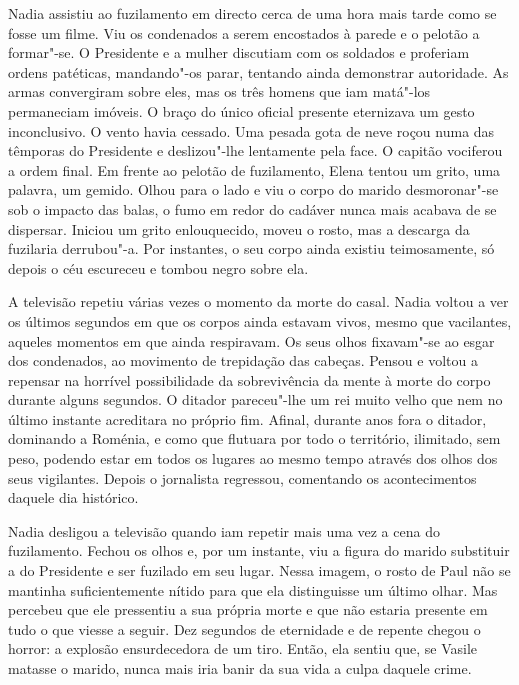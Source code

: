 Nadia assistiu ao fuzilamento em directo cerca de uma hora mais tarde
como se fosse um filme. Viu os condenados a serem encostados à parede
e o pelotão a formar"-se. O Presidente e a mulher discutiam com os
soldados e proferiam ordens patéticas, mandando"-os parar, tentando ainda
demonstrar autoridade. As armas convergiram sobre eles, mas os três
homens que iam matá"-los permaneciam imóveis. O braço do único oficial
presente eternizava um gesto inconclusivo. O vento havia cessado. Uma
pesada gota de neve roçou numa das têmporas do Presidente e deslizou"-lhe
lentamente pela face. O capitão vociferou a ordem final. Em frente ao
pelotão de fuzilamento, Elena tentou um grito, uma palavra, um gemido.
Olhou para o lado e viu o corpo do marido desmoronar"-se sob o impacto
das balas, o fumo em redor do cadáver nunca mais acabava de se dispersar. Iniciou um grito enlouquecido, moveu o rosto, mas
a descarga da fuzilaria derrubou"-a. Por instantes, o seu corpo ainda
existiu teimosamente, só depois o céu escureceu e tombou negro sobre
ela.

A televisão repetiu várias vezes o momento da morte do casal. Nadia
voltou a ver os últimos segundos em que os corpos ainda estavam vivos,
mesmo que vacilantes, aqueles momentos em que ainda respiravam. Os
seus olhos fixavam"-se ao esgar dos condenados, ao movimento de
trepidação das cabeças. Pensou e voltou a repensar na horrível
possibilidade da sobrevivência da mente à morte do corpo durante alguns
segundos. O ditador pareceu"-lhe um rei muito velho que nem no último
instante acreditara no próprio fim. Afinal, durante anos fora o ditador,
dominando a Roménia, e como que flutuara por todo o território,
ilimitado, sem peso, podendo estar em todos os lugares ao mesmo tempo
através dos olhos dos seus vigilantes. Depois o jornalista regressou,
comentando os acontecimentos daquele dia histórico.

Nadia desligou a televisão quando iam repetir mais uma
vez a cena do fuzilamento. Fechou os olhos e, por um instante, viu a
figura do marido substituir a do Presidente e ser fuzilado em seu lugar.
Nessa imagem, o rosto de Paul não se mantinha suficientemente nítido
para que ela distinguisse um último olhar. Mas percebeu que ele
pressentiu a sua própria morte e que não estaria presente em tudo o que
viesse a seguir. Dez segundos de eternidade e de repente chegou o
horror: a explosão ensurdecedora de um tiro. Então, ela sentiu que, se
Vasile matasse o marido, nunca mais iria banir da sua vida a culpa
daquele crime.

